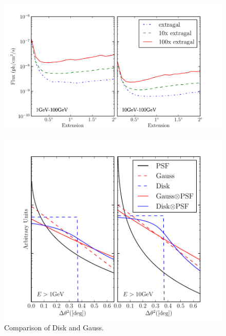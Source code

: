 \documentclass[12pt,preprint]{aastex}
\begin{document}
\clearpage

\begin{figure}
  \begin{center}
    \includegraphics{mc_plots/diff_factor_sensitivity.pdf}
    \end{center}
    \caption{
    }\label{diff_factor_sensitivity}
  \end{figure}

  \begin{figure}
    \begin{center}
      \includegraphics{mc_plots/compare_disk_gauss.pdf}
    \end{center}
    \caption{Comparison of Disk and Gauss.
    }\label{compare_disk_gauss}
  \end{figure}
\end{document}
